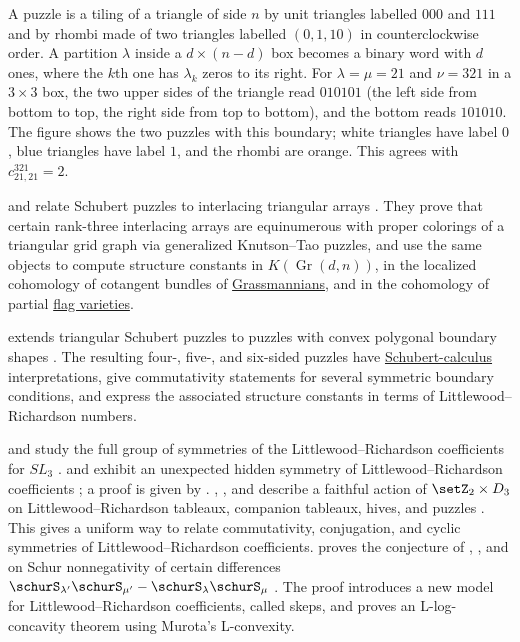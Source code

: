 \begin{example}
A puzzle is a tiling of a triangle of side $n$ by unit triangles labelled
$000$ and $111$ and by rhombi made of two triangles labelled $(0,1,10)$ in
counterclockwise order.  A partition $\lambda$ inside a $d\times(n-d)$ box
becomes a binary word with $d$ ones, where the $k$th one has $\lambda_k$
zeros to its right.  For $\lambda=\mu=21$ and $\nu=321$ in a $3\times3$ box,
the two upper sides of the triangle read $010101$ (the left side from bottom
to top, the right side from top to bottom), and the bottom reads $101010$.
The figure shows the two puzzles with this boundary; white triangles have
label $0$, blue triangles have label $1$, and the rhombi are orange.  This
agrees with $c^{321}_{21,21}=2$.
\begin{figure}
\end{figure}
\end{example}

 and  relate Schubert puzzles to
interlacing triangular arrays \cite{GaetzGao2025}.  They prove that certain
rank-three interlacing arrays are equinumerous with proper colorings of a
triangular grid graph via generalized Knutson--Tao puzzles, and use the same
objects to compute structure constants in $K(\operatorname{Gr}(d,n))$, in the
localized cohomology of cotangent bundles of \hyperref[grassmannian]{Grassmannians},
and in the cohomology of partial \hyperref[flagVarieties]{flag varieties}.

 extends triangular Schubert puzzles to puzzles with
convex polygonal boundary shapes \cite{Anderson2024Puzzlesx}.  The resulting
four-, five-, and six-sided puzzles have
\hyperref[schubertCalculus]{Schubert-calculus} interpretations,
give commutativity statements for several symmetric boundary conditions, and
express the associated structure constants in terms of
Littlewood--Richardson numbers.

 and  study the full group of
symmetries of the Littlewood--Richardson coefficients for $SL_3$
\cite{BriandRosas2020x}.   and
 exhibit an unexpected hidden symmetry of
Littlewood--Richardson coefficients \cite{PelletierRessayre2022}; a proof is
given by  \cite{Grinberg2021}.
, , and 
describe a faithful action of $\setZ_2\times D_3$ on Littlewood--Richardson
tableaux, companion tableaux, hives, and puzzles \cite{AzenhasConflittiMamede2025x}.
This gives a uniform way to relate commutativity, conjugation, and cyclic
symmetries of Littlewood--Richardson coefficients.
 proves the conjecture of
, , and 
on Schur nonnegativity of certain differences
$\schurS_{\lambda'}\schurS_{\mu'}-\schurS_\lambda\schurS_\mu$
\cite{Speyer2026x}.  The proof introduces a new model for
Littlewood--Richardson coefficients, called skeps, and proves an
L-log-concavity theorem using Murota's L-convexity.

